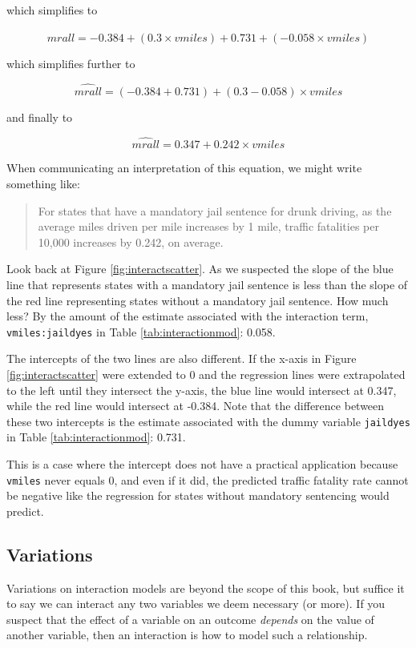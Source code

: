 \documentclass[
]{book}
\begin{document}
which simplifies to

\[\hat{mrall} = -0.384 + (0.3\times vmiles) + 0.731 + (-0.058\times vmiles)\]

which simplifies further to

\[\hat{mrall} = (-0.384 + 0.731) + (0.3-0.058)\times vmiles\]

and finally to

\[\hat{mrall} = 0.347 + 0.242\times vmiles\]

When communicating an interpretation of this equation, we might write something like:

\begin{quote}
For states that have a mandatory jail sentence for drunk driving, as the average miles driven per mile increases by 1 mile, traffic fatalities per 10,000 increases by 0.242, on average.
\end{quote}

Look back at Figure \ref{fig:interactscatter}. As we suspected the slope of the blue line that represents states with a mandatory jail sentence is less than the slope of the red line representing states without a mandatory jail sentence. How much less? By the amount of the estimate associated with the interaction term, \texttt{vmiles:jaildyes} in Table \ref{tab:interactionmod}: 0.058.

The intercepts of the two lines are also different. If the x-axis in Figure \ref{fig:interactscatter} were extended to 0 and the regression lines were extrapolated to the left until they intersect the y-axis, the blue line would intersect at 0.347, while the red line would intersect at -0.384. Note that the difference between these two intercepts is the estimate associated with the dummy variable \texttt{jaildyes} in Table \ref{tab:interactionmod}: 0.731.

This is a case where the intercept does not have a practical application because \texttt{vmiles} never equals 0, and even if it did, the predicted traffic fatality rate cannot be negative like the regression for states without mandatory sentencing would predict.

\hypertarget{variations}{%
\subsection{Variations}\label{variations}}

Variations on interaction models are beyond the scope of this book, but suffice it to say we can interact any two variables we deem necessary (or more). If you suspect that the effect of a variable on an outcome \emph{depends} on the value of another variable, then an interaction is how to model such a relationship.
\end{document}

